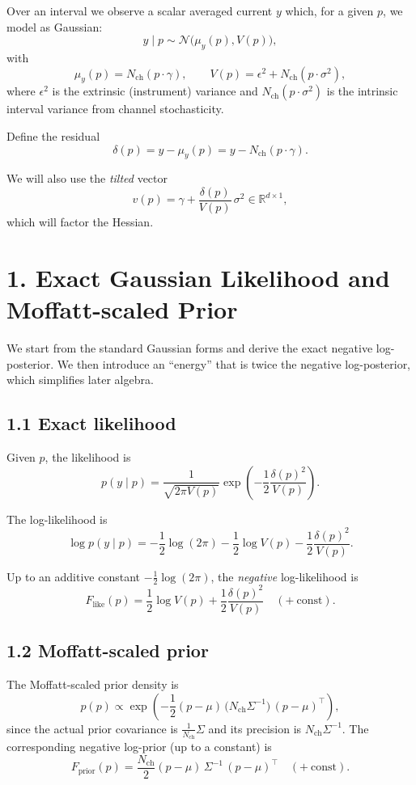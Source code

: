 \documentclass[11pt]{article}
\begin{document}
Over an interval we observe a scalar averaged current $y$ which, for a
given $p$, we model as Gaussian:
\[
  y \mid p
  \sim
  \mathcal{N}\bigl(\mu_y(p), V(p)\bigr),
\]
with
\[
  \mu_y(p) = N_{\text{ch}}(p\cdot\gamma),
  \qquad
  V(p) = \epsilon^2 + N_{\text{ch}}(p\cdot\sigma^2),
\]
where $\epsilon^2$ is the extrinsic (instrument) variance and
$N_{\text{ch}}(p\cdot\sigma^2)$ is the intrinsic interval variance
from channel stochasticity.

Define the residual
\[
  \delta(p) = y - \mu_y(p) = y - N_{\text{ch}}(p\cdot\gamma).
\]

We will also use the \emph{tilted} vector
\[
  v(p)
  =
  \gamma + \frac{\delta(p)}{V(p)}\,\sigma^2
  \in \mathbb{R}^{d\times 1},
\]
which will factor the Hessian.

\section*{1. Exact Gaussian Likelihood and Moffatt-scaled Prior}

We start from the standard Gaussian forms and derive the exact
negative log-posterior.  We then introduce an ``energy'' that is
twice the negative log-posterior, which simplifies later algebra.

\subsection*{1.1 Exact likelihood}

Given $p$, the likelihood is
\[
  p(y\mid p)
  =
  \frac{1}{\sqrt{2\pi V(p)}}
  \exp\!\left(
    -\frac{1}{2}\frac{\delta(p)^2}{V(p)}
  \right).
\]

The log-likelihood is
\[
  \log p(y\mid p)
  =
  -\frac{1}{2}\log(2\pi)
  -\frac{1}{2}\log V(p)
  -\frac{1}{2}\frac{\delta(p)^2}{V(p)}.
\]

Up to an additive constant $-\frac12\log(2\pi)$, the \emph{negative}
log-likelihood is
\[
  F_{\text{like}}(p)
  =
  \frac{1}{2}\log V(p)
  + \frac{1}{2}\frac{\delta(p)^2}{V(p)}
  \quad(+\ \text{const}).
\]

\subsection*{1.2 Moffatt-scaled prior}

The Moffatt-scaled prior density is
\[
  p(p)
  \propto
  \exp\!\left(
    -\frac{1}{2}(p-\mu)\,\bigl(N_{\text{ch}}\Sigma^{-1}\bigr)\,(p-\mu)^\top
  \right),
\]
since the actual prior covariance is $\tfrac{1}{N_{\text{ch}}}\Sigma$
and its precision is $N_{\text{ch}}\Sigma^{-1}$.  The corresponding
negative log-prior (up to a constant) is
\[
  F_{\text{prior}}(p)
  =
  \frac{N_{\text{ch}}}{2}(p-\mu)\,\Sigma^{-1}\,(p-\mu)^\top
  \quad(+\ \text{const}).
\]
\end{document}
